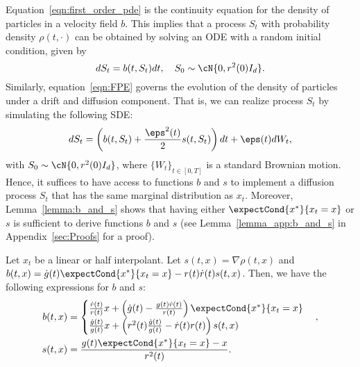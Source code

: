 Equation~\ref{eqn:first_order_pde} is the continuity equation for the density of particles in a velocity field $b$. This implies that a process $S_t$ with probability density $\rho(t,\cdot)$ can be obtained by solving an ODE with a random initial condition, given by
\begin{equation}\label{eqn:ODEforSampling}
dS_t = b(t,S_t)dt,\quad S_0\sim\cN{0,r^2(0)I_d}.    
\end{equation}
Similarly, equation~\ref{eqn:FPE} governs the evolution of the density of particles under a drift and diffusion component. That is, we can realize process $S_t$ by simulating the following SDE:
\begin{equation}\label{eqn:SDEforSampling}
   dS_t = \left(b(t,S_t)+\frac{\eps^2(t)}{2}s(t,S_t)\right)dt+\eps(t)dW_t,%
\end{equation}
with $S_0\sim\cN{0,r^2(0)I_d}$, where $\{W_t\}_{t\in[0,T]}$ is a standard Brownian motion. Hence, it suffices to have access to functions $b$ and $s$ to implement a diffusion process $S_t$ that has the same marginal distribution as $x_t$. Moreover, Lemma~\ref{lemma:b_and_s} shows that having either $\expectCond{x^*}{x_t=x}$ or $s$ is sufficient to derive functions $b$ and $s$ (see Lemma~\ref{lemma_app:b_and_s} in Appendix~\ref{sec:Proofs} for a proof).
\begin{lemma}\label{lemma:b_and_s}
    Let $x_t$ be a linear or half interpolant. Let $s(t,x) = \nabla \rho(t,x)$ and $b(t,x) = \dot g(t)\expectCond{x^*}{x_t=x}-r(t)\dot r(t)s(t,x)$. Then, we have the following expressions for $b$ and $s$:
\begin{align}\label{eqn:b_and_s}
\begin{split}
  b(t,x) &= \begin{cases}
      \frac{\dot r(t)}{r(t)}x+\left(\dot g(t)-\frac{g(t)\dot r(t)}{r(t)}\right)\expectCond{x^*}{x_t=x}\\
      \frac{\dot g(t)}{g(t)}x+\left(r^2(t)\frac{\dot g(t)}{g(t)}-\dot r(t)r(t)\right)s(t,x)
      \end{cases}, \\
s(t,x) &= \frac{g(t)\expectCond{x^*}{x_t=x}-x}{r^2(t)}.
\end{split}  
\end{align}
\end{lemma}

